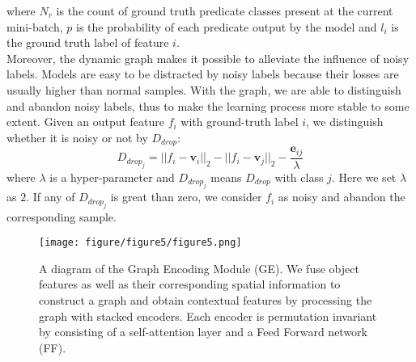 \documentclass[sigconf]{acmart}
\begin{document}
where $N_r$ is the count of ground truth predicate classes present at the current mini-batch, $p$ is the probability of each predicate output by the model and $l_i$ is the ground truth label of feature $i$.
\\\indent Moreover, the dynamic graph makes it possible to alleviate the influence of noisy labels. Models are easy to be distracted by noisy labels because their losses are usually higher than normal samples. With the graph, we are able to distinguish and abandon noisy labels, thus to make the learning process more stable to some extent. Given an output feature ${f}_{i}$ with ground-truth label ${i}$, we distinguish whether it is noisy or not by ${D}_{drop}$:
\begin{equation}\label{eq:drop}
    {D}_{drop_j} = {||{f}_{i} - {\textbf{v}}_{i}||_2 - ||{f}_{i} - {\textbf{v}}_{j}||_2} - \frac{{{\textbf{e}}_{ij}}}{\lambda}
\end{equation}
where ${\lambda}$ is a hyper-parameter and ${D}_{drop_j}$ means ${D}_{drop}$ with class ${j}$. Here we set ${\lambda}$ as ${2}$. If any of ${D}_{drop_j}$ is great than zero, we consider ${f}_{i}$ as noisy and abandon the corresponding sample.
\begin{figure}[h]
    \centering
    \texttt{[image: figure/figure5/figure5.png]}
    \caption{A diagram of the Graph Encoding Module (GE). We fuse object features as well as their corresponding spatial information to construct a graph and obtain contextual features by processing the graph with stacked encoders. Each encoder is permutation invariant by consisting of a self-attention layer and a Feed Forward network (FF).}
    \label{fig:context_encoding}
\end{figure}
\end{document}
